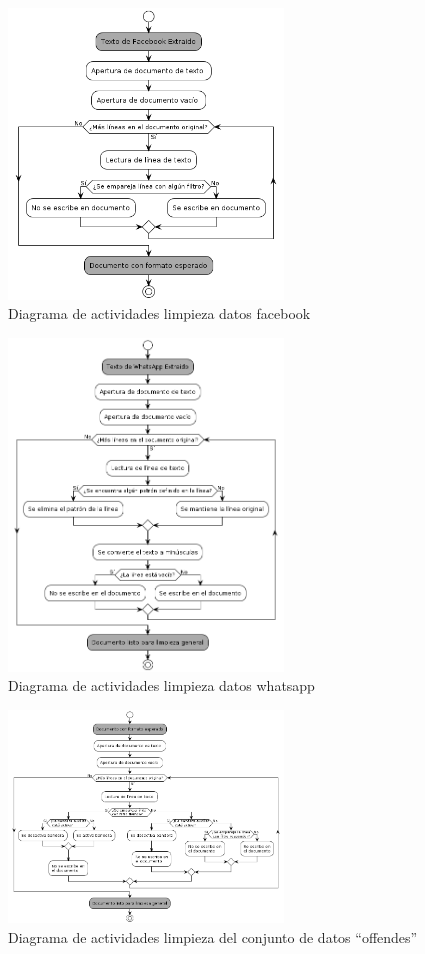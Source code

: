 \begin{figure}
	\includegraphics[width=0.65\textwidth]{capitulo5/figuras/part0.png}
	\caption{Diagrama de actividades limpieza datos facebook}
	\label{fig:um12}
\end{figure}

\begin{figure}
	\includegraphics[width=0.65\textwidth]{capitulo5/figuras/part3.png}
	\caption{Diagrama de actividades limpieza datos whatsapp}
	\label{fig:um14}
\end{figure}


\begin{figure}
	\includegraphics[width=0.65\textwidth]{capitulo5/figuras/part1.png}
	\caption{Diagrama de actividades  limpieza del conjunto de datos ``offendes''}
	\label{fig:um13}
\end{figure}
